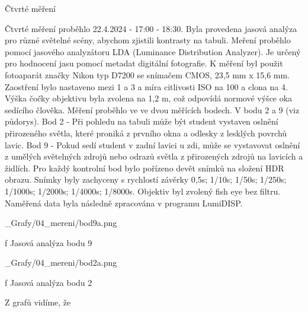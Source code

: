 \sec Čtvrté měření

Čtvrté měření proběhlo 22.4.2024 - 17:00 - 18:30.
Byla provedena jasová analýza pro různé světelné scény, abychom zjistili kontrasty na tabuli.
Meření proběhlo pomocí jasového analyzátoru LDA (Luminance Distribution Analyzer). Je určený pro hodnocení
jasu pomocí metadat digitální fotografie. 
\medskip
K měření byl použit fotoaparát značky Nikon typ D7200 se snímačem CMOS, 23,5 mm x 15,6 mm.
Zaostření bylo nastaveno mezi 1 a 3 a míra citlivosti ISO na 100 a clona na 4. Výška čočky
objektivu byla zvolena na 1,2 m, což odpovídá normové výšce oka sedícího člověka.
\medskip
Měření proběhlo ve ve dvou měřících bodech. V bodu 2 a 9 (viz půdorys).
\medskip
Bod 2 - Při pohledu na tabuli může být student vystaven oslnění přirozeného světla, které proniká z prvního okna a odlesky z lesklých povrchů lavic.
\medskip
Bod 9 -  Pokud sedí student v zadní lavici u zdi, může se vystavovat oslnění z umělých světelných zdrojů nebo odrazů světla z přirozených zdrojů na lavicích a židlích.
\medskip
Pro každý kontrolní bod bylo pořízeno devět snímků na složení HDR obrazu. Snímky
byly zachyceny s rychlostí závěrky 0,5s; 1/10s; 1/50s; 1/250s; 1/1000s; 1/2000s; 1/4000s; 1/8000s. Objektiv byl zvolený fish eye bez filtru.
Naměřená data byla následně zpracována v programu LumiDISP.

\medskip
\medskip {}
\picw=14cm _Grafy/04_mereni/bod9a.png
\caption/f Jasová analýza bodu 9
\medskip

\medskip
\medskip {}
\picw=14cm _Grafy/04_mereni/bod2a.png
\caption/f Jasová analýza bodu 2
\medskip
\medskip

Z grafů vidíme, že 






















